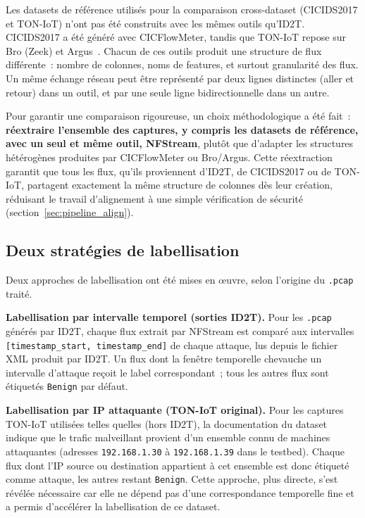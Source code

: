 \documentclass[12pt, a4paper]{report}
\begin{document}
Les datasets de référence utilisés pour la comparaison cross-dataset (CICIDS2017 et TON-IoT) n'ont pas été construits avec les mêmes outils
qu'ID2T. CICIDS2017 a été généré avec CICFlowMeter, tandis que TON-IoT
repose sur Bro (Zeek) et Argus~\cite{alsaedi2020}. Chacun de ces outils
produit une structure de flux différente~: nombre de colonnes, noms de
features, et surtout granularité des flux. Un même échange réseau peut
être représenté par deux lignes distinctes (aller et retour) dans un
outil, et par une seule ligne bidirectionnelle dans un autre.
 
Pour garantir une comparaison rigoureuse, un choix méthodologique a été
fait~: \textbf{réextraire l'ensemble des captures, y compris les
datasets de référence, avec un seul et même outil, NFStream}, plutôt
que d'adapter les structures hétérogènes produites par CICFlowMeter ou
Bro/Argus. Cette réextraction garantit que tous les flux, qu'ils
proviennent d'ID2T, de CICIDS2017 ou de TON-IoT, partagent exactement
la même structure de colonnes dès leur création, réduisant le travail
d'alignement à une simple vérification de sécurité (section~\ref{sec:pipeline_align}).
 
\subsection{Deux stratégies de labellisation}
 
Deux approches de labellisation ont été mises en œuvre, selon l'origine
du \texttt{.pcap} traité.
 
\textbf{Labellisation par intervalle temporel (sorties ID2T).} Pour les
\texttt{.pcap} générés par ID2T, chaque flux extrait par NFStream est
comparé aux intervalles \texttt{[timestamp\_start, timestamp\_end]} de
chaque attaque, lus depuis le fichier XML produit par ID2T. Un flux dont
la fenêtre temporelle chevauche un intervalle d'attaque reçoit le label
correspondant~; tous les autres flux sont étiquetés \texttt{Benign} par
défaut.
 
\textbf{Labellisation par IP attaquante (TON-IoT original).} Pour les
captures TON-IoT utilisées telles quelles (hors ID2T), la documentation
du dataset indique que le trafic malveillant provient d'un ensemble
connu de machines attaquantes (adresses \texttt{192.168.1.30} à
\texttt{192.168.1.39} dans le testbed). Chaque flux dont l'IP source ou
destination appartient à cet ensemble est donc étiqueté comme attaque,
les autres restant \texttt{Benign}. Cette approche, plus directe,
s'est révélée nécessaire car elle ne dépend pas d'une correspondance
temporelle fine et a permis d'accélérer la labellisation de ce dataset.
\end{document}
